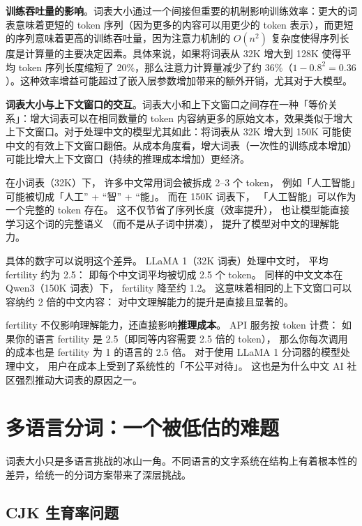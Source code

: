 \textbf{训练吞吐量的影响}。词表大小通过一个间接但重要的机制影响训练效率：更大的词表意味着更短的 token 序列（因为更多的内容可以用更少的 token 表示），而更短的序列意味着更高的训练吞吐量，因为注意力机制的 $O(n^2)$ 复杂度使得序列长度是计算量的主要决定因素。具体来说，如果将词表从 32K 增大到 128K 使得平均 token 序列长度缩短了 20\%，那么注意力计算量减少了约 36\%（$1 - 0.8^2 = 0.36$）。这种效率增益可能超过了嵌入层参数增加带来的额外开销，尤其对于大模型。

\textbf{词表大小与上下文窗口的交互}。词表大小和上下文窗口之间存在一种「等价关系」：增大词表可以在相同数量的 token 内容纳更多的原始文本，效果类似于增大上下文窗口。对于处理中文的模型尤其如此：将词表从 32K 增大到 150K 可能使中文的有效上下文窗口翻倍。从成本角度看，增大词表（一次性的训练成本增加）可能比增大上下文窗口（持续的推理成本增加）更经济。

\begin{whybox}[为什么大词表能帮助中文？]
在小词表（32K）下，
许多中文常用词会被拆成 2--3 个 token，
例如「人工智能」可能被切成「人工” + “智” + “能」。
而在 150K 词表下，
「人工智能」可以作为一个完整的 token 存在。
这不仅节省了序列长度（效率提升），
也让模型能直接学习这个词的完整语义
（而不是从子词中拼凑），
提升了模型对中文的理解能力。

具体的数字可以说明这个差异。
LLaMA 1（32K 词表）处理中文时，
平均 fertility 约为 2.5：
即每个中文词平均被切成 2.5 个 token。
同样的中文文本在 Qwen3（150K 词表）下，
fertility 降至约 1.2。
这意味着相同的上下文窗口可以容纳约 2 倍的中文内容：
对中文理解能力的提升是直接且显著的。
\end{whybox}

\begin{warnbox}
fertility 不仅影响理解能力，还直接影响\textbf{推理成本}。
API 服务按 token 计费：
如果你的语言 fertility 是 2.5（即同等内容需要 2.5 倍的 token），
那么你每次调用的成本也是 fertility 为 1 的语言的 2.5 倍。
对于使用 LLaMA 1 分词器的模型处理中文，
用户在成本上受到了系统性的「不公平对待」。
这也是为什么中文 AI 社区强烈推动大词表的原因之一。
\end{warnbox}

\section{多语言分词：一个被低估的难题}

词表大小只是多语言挑战的冰山一角。不同语言的文字系统在结构上有着根本性的差异，给统一的分词方案带来了深层挑战。

\subsection{CJK 生育率问题}

